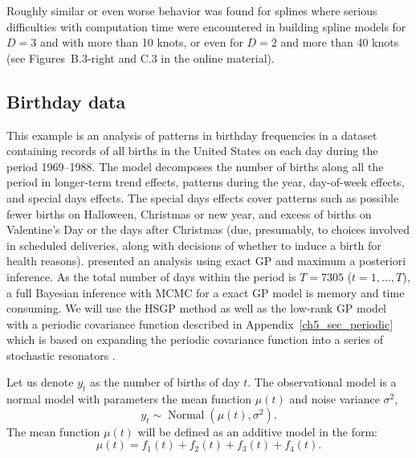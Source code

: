 \documentclass[onecolumn,a4paper,11pt]{article}
\DeclareMathOperator{\Normal}{Normal}
\begin{document}

Roughly similar or even worse behavior was found for splines where serious difficulties with computation time were encountered in building spline models for $D=3$ and with more than 10 knots, or even for $D=2$ and more than 40 knots (see Figures~B.3-right and C.3 in the online material).


\subsection{Birthday data}\label{ch5_sec_birthday}
%
This example is an analysis of patterns in birthday frequencies in a dataset containing records of all births in the United States on each day during the period 1969–1988. The model decomposes the number of births along all the period in longer-term trend effects, patterns during the year, day-of-week effects, and special days effects. The special days effects cover patterns such as possible fewer births on Halloween, Christmas or new year, and excess of births on Valentine’s Day or the days after Christmas (due, presumably, to choices involved in scheduled deliveries, along with decisions of whether to induce a birth for health reasons). \citet{gelman2013bayesian} presented an analysis using exact GP and maximum a posteriori inference. As the total number of days within the period is $T=7305$ ($t=1,\dots,T$), a full Bayesian inference with MCMC for a exact GP model is memory and time consuming. We will use the HSGP method as well as the low-rank GP model with a periodic covariance function described in Appendix~\ref{ch5_sec_periodic} which is based on expanding the periodic covariance function into a series of stochastic resonators \citep{solin2014explicit}.

Let us denote $y_t$ as the number of births of day $t$. The observational model is a normal model with parameters the mean function $\mu(t)$ and noise variance $\sigma^2$,
%
\begin{equation*}
y_{t} \sim \Normal(\mu(t),\sigma^2).
\end{equation*}
%
The mean function $\mu(t)$ will be defined as an additive model in the form: 
%
\begin{equation} \label{ch5_eq_mean_brithday}
\mu(t) = f_1(t) + f_2(t) + f_3(t) + f_4(t).
\end{equation}
\end{document}
